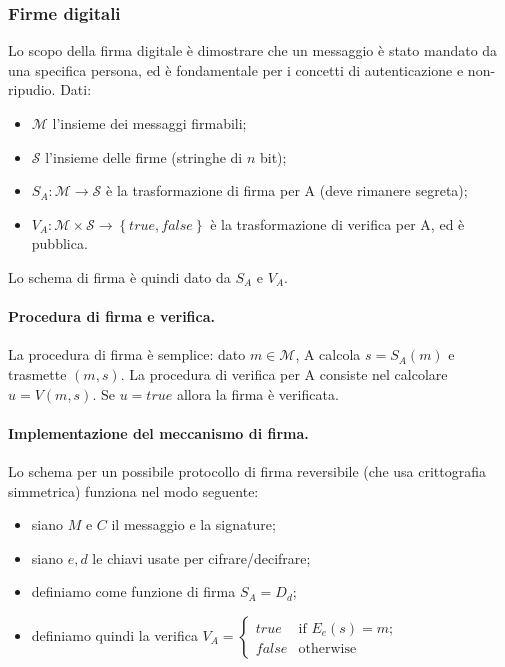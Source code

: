 \documentclass[a4paper, 10pt, twoside]{article}
\begin{document}
	\subsubsection{Firme digitali}
	Lo scopo della firma digitale è dimostrare che un messaggio è stato mandato da una specifica persona, ed è fondamentale per i concetti di autenticazione e non-ripudio. Dati: \begin{itemize}
		\item $\mathcal{M}$ l'insieme dei messaggi firmabili;
		\item $\mathcal{S}$ l'insieme delle firme (stringhe di $n$ bit);
		\item $S_A:\mathcal{M} \to \mathcal{S}$ è la trasformazione di firma per A (deve rimanere segreta);
		\item $V_A:\mathcal{M} \times \mathcal{S} \to \left\{true, false \right\}$ è la trasformazione di verifica per A, ed è pubblica.
	\end{itemize}

	Lo schema di firma è quindi dato da $S_A$ e $V_A$.
	\paragraph{Procedura di firma e verifica.} La procedura di firma è semplice: dato $m \in \mathcal{M}$, A calcola $s=S_A(m)$ e trasmette $(m,s)$. La procedura di verifica per A consiste nel calcolare $u=V(m,s)$. Se $u=true$ allora la firma è verificata.
	
	\paragraph{Implementazione del meccanismo di firma.}
	Lo schema per un possibile protocollo di firma reversibile (che usa crittografia simmetrica) funziona nel modo seguente: \begin{itemize}
		\item siano $M$ e $C$ il messaggio e la signature;
		\item siano $e,d$ le chiavi usate per cifrare/decifrare;
		\item definiamo come funzione di firma $S_A = D_d$;
		\item definiamo quindi la verifica $V_A = \begin{cases}
			true &\text{if } E_e(s) = m; \\
			false &\text{otherwise}
		\end{cases}$
	\end{itemize}
\end{document}
